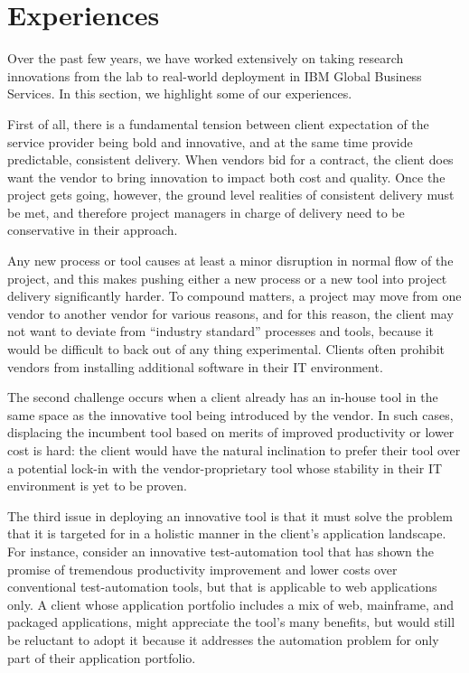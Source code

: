 \section{Experiences}

Over the past few years, we have worked extensively on taking research
innovations from the lab to real-world deployment in IBM Global Business
Services. In this section, we highlight some of our experiences.

First of all, there is a fundamental tension between client expectation of the
service provider being bold and innovative, and at the same time provide
predictable, consistent delivery.  When vendors bid for a contract, the client
does want the vendor to bring innovation to impact both cost and quality. Once
the project gets going, however, the ground level realities of consistent
delivery must be met, and therefore project managers in charge of delivery need
to be conservative in their approach.

Any new process or tool causes at least a minor disruption in normal flow of
the project, and this makes pushing either a new process or a new tool into
project delivery significantly harder.  To compound matters, a project may move
from one vendor to another vendor for various reasons, and for this reason, the
client may not want to deviate from ``industry standard'' processes and tools,
because it would be difficult to back out of any thing experimental. Clients
often prohibit vendors from installing additional software in their IT
environment.

The second challenge occurs when a client already has an in-house tool in the
same space as the innovative tool being introduced by the vendor. In such cases,
displacing the incumbent tool based on merits of improved productivity or lower
cost is hard: the client would have the natural inclination to prefer their tool
over a potential lock-in with the vendor-proprietary tool whose stability in
their IT environment is yet to be proven.

The third issue in deploying an innovative tool is that it must solve the
problem that it is targeted for in a holistic manner in the client's application
landscape. For instance, consider an innovative test-automation tool that has
shown the promise of tremendous productivity improvement and lower costs over
conventional test-automation tools, but that is applicable to web applications
only. A client whose application portfolio includes a mix of web, mainframe, and
packaged applications, might appreciate the tool's many benefits, but would
still be reluctant to adopt it because it addresses the automation problem for
only part of their application portfolio.

